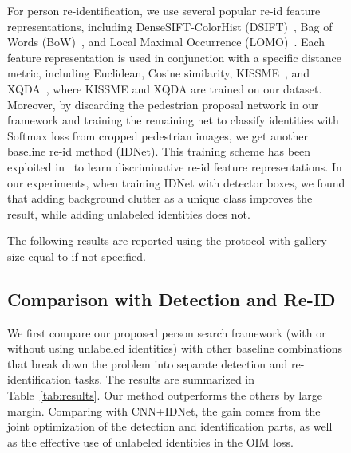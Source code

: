 \documentclass[10pt,twocolumn,letterpaper]{article}
\begin{document}
\begin{figure}[t]
\begin{center}
For person re-identification, we use several popular re-id feature representations, including DenseSIFT-ColorHist (DSIFT)~\cite{zhao2013unsupervised}, Bag of Words (BoW)~\cite{zheng2015scalable}, and Local Maximal Occurrence (LOMO)~\cite{liao2015person}. Each feature representation is used in conjunction with a specific distance metric, including Euclidean, Cosine similarity, KISSME~\cite{koestinger2012large}, and XQDA~\cite{liao2015person}, where KISSME and XQDA are trained on our dataset. Moreover, by discarding the pedestrian proposal network in our framework and training the remaining net to classify identities with Softmax loss from cropped pedestrian images, we get another baseline re-id method (IDNet). This training scheme has been exploited in~\cite{xiao2016learning} to learn discriminative re-id feature representations. In our experiments, when training IDNet with detector boxes, we found that adding background clutter as a unique class improves the result, while adding unlabeled identities does not.

The following results are reported using the protocol with gallery size equal to  if not specified.


\subsection{Comparison with Detection and Re-ID} \label{sub:comparison_with_detection_and_re_id}
We first compare our proposed person search framework (with or without using unlabeled identities) with other  baseline combinations that break down the problem into separate detection and re-identification tasks. The results are summarized in Table~\ref{tab:results}. Our method outperforms the others by large margin. Comparing with CNN+IDNet, the gain comes from the joint optimization of the detection and identification parts, as well as the effective use of unlabeled identities in the OIM loss.



\end{center}
\end{figure}
\end{document}

